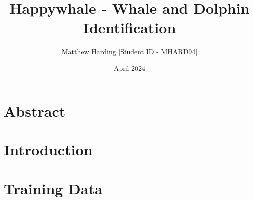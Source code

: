 \documentclass{article}
\title{Happywhale - Whale and Dolphin Identification}
\author{Matthew Harding [Student ID - MHARD94]}
\date{April 2024}
\begin{document}
\maketitle

\section{Abstract}


\section{Introduction}


\section{Training Data}



\end{document}
